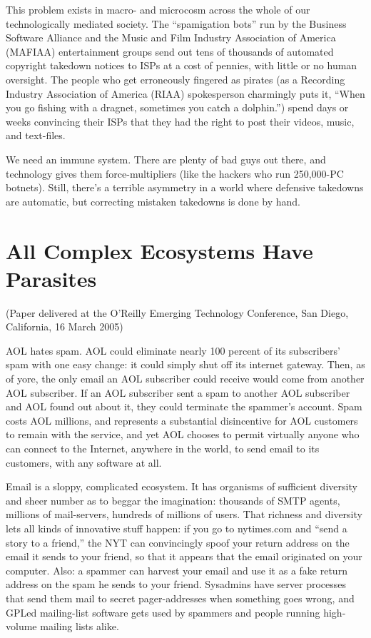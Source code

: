 This problem exists in macro- and microcosm across the whole of our
technologically mediated society. The “spamigation bots” run by the
Business Software Alliance and the Music and Film Industry
Association of America (MAFIAA) entertainment groups send out tens
of thousands of automated copyright takedown notices to ISPs at a
cost of pennies, with little or no human oversight. The people who
get erroneously fingered as pirates (as a Recording Industry
Association of America (RIAA) spokesperson charmingly puts it,
“When you go fishing with a dragnet, sometimes you catch a
dolphin.”) spend days or weeks convincing their ISPs that they had
the right to post their videos, music, and text-files.

We need an immune system. There are plenty of bad guys out there,
and technology gives them force-multipliers (like the hackers who
run 250,000-PC botnets). Still, there’s a terrible asymmetry in a
world where defensive takedowns are automatic, but correcting
mistaken takedowns is done by hand.

\section{All Complex Ecosystems Have Parasites}

(Paper delivered at the O'Reilly Emerging Technology Conference,
San Diego, California, 16 March 2005)

AOL hates spam. AOL could eliminate nearly 100 percent of its
subscribers' spam with one easy change: it could simply shut off
its internet gateway. Then, as of yore, the only email an AOL
subscriber could receive would come from another AOL subscriber. If
an AOL subscriber sent a spam to another AOL subscriber and AOL
found out about it, they could terminate the spammer's account.
Spam costs AOL millions, and represents a substantial disincentive
for AOL customers to remain with the service, and yet AOL chooses
to permit virtually anyone who can connect to the Internet,
anywhere in the world, to send email to its customers, with any
software at all.

Email is a sloppy, complicated ecosystem. It has organisms of
sufficient diversity and sheer number as to beggar the imagination:
thousands of SMTP agents, millions of mail-servers, hundreds of
millions of users. That richness and diversity lets all kinds of
innovative stuff happen: if you go to nytimes.com and ``send a story
to a friend,'' the NYT can convincingly spoof your return address on
the email it sends to your friend, so that it appears that the
email originated on your computer. Also: a spammer can harvest your
email and use it as a fake return address on the spam he sends to
your friend. Sysadmins have server processes that send them mail to
secret pager-addresses when something goes wrong, and GPLed
mailing-list software gets used by spammers and people running
high-volume mailing lists alike.

